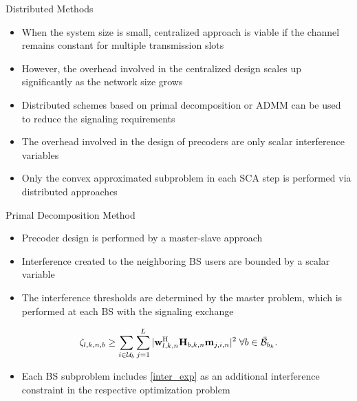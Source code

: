 \documentclass[10pt]{beamer}
\begin{document}
\begin{frame}{Distributed Methods}
	\begin{itemize}
		\item When the system size is small, centralized approach is viable if the channel remains constant for multiple transmission slots
		\item However, the overhead involved in the centralized design scales up significantly as the network size grows
		\item Distributed schemes based on primal decomposition or \acs{ADMM} can be used to reduce the signaling requirements
		\item The overhead involved in the design of precoders are only scalar interference variables
		\item Only the convex approximated subproblem in each \acs{SCA} step is performed via distributed approaches
	\end{itemize}
\end{frame}

\begin{frame}{Primal Decomposition Method}
	\begin{itemize}
		\item Precoder design is performed by a master-slave approach
		\item Interference created to the neighboring \ac{BS} users are bounded by a scalar variable
		\item The interference thresholds are determined by the master problem, which is performed at each \ac{BS} with the signaling exchange
	\end{itemize}
	\begin{equation} \label{inter_exp}
	\zeta_{l,k,n,b} \geq \sum_{i \in \mathcal{U}_b} \sum_{j = 1}^L |\mathbf{w}_{l,k,n}^{\mathrm{H}} \mathbf{H}_{b,k,n} \mathbf{m}_{j,i,n} |^2 \; \forall b \in \bar{\mathcal{B}}_{b_k}.
	\end{equation}
	\begin{itemize}
		\item Each \ac{BS} subproblem includes \eqref{inter_exp} as an additional interference constraint in the respective optimization problem
	\end{itemize}
\end{frame}
\end{document}
